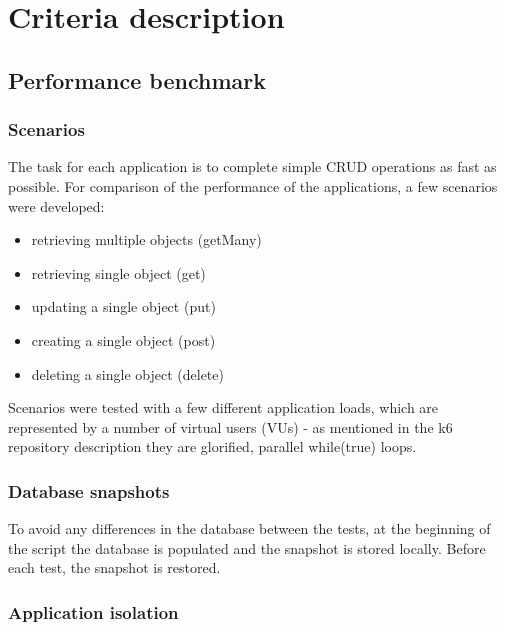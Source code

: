 
\chapter{Criteria description}

\section{Performance benchmark}

\subsection{Scenarios}
The task for each application is to complete simple CRUD operations as fast as possible. For comparison of the performance of the applications, a few scenarios were developed:

\begin{itemize}
    \item retrieving multiple objects (getMany)
    \item retrieving single object (get)
    \item updating a single object (put)
    \item creating a single object (post)
    \item deleting a single object (delete)
\end{itemize}

Scenarios were tested with a few different application loads, which are represented by a number of virtual users (VUs) - as mentioned in the k6 repository description they are glorified, parallel while(true) loops. 


\subsection{Database snapshots}

To avoid any differences in the database between the tests, at the beginning of the script the database is populated and the snapshot is stored locally. Before each test, the snapshot is restored.


\subsection{Application isolation}

